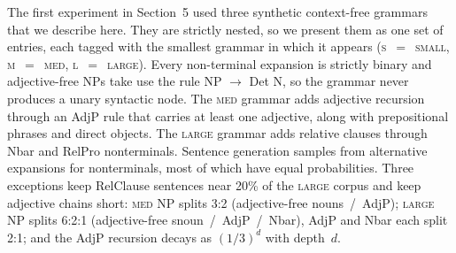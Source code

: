 \documentclass[11pt,letterpaper]{article}
\begin{document}
The first experiment in Section~5 used three synthetic context-free 
grammars that we describe here. They are strictly nested, so we 
present them as one set of entries, each tagged with the smallest 
grammar in which it appears (\textsc{s}~$=$~\textsc{small}, 
\textsc{m}~$=$~\textsc{med}, \textsc{l}~$=$~\textsc{large}). 
Every non-terminal expansion is strictly binary and adjective-free 
NPs take use the rule NP $\rightarrow$ Det N, so the grammar never 
produces a unary syntactic node. The \textsc{med} grammar adds adjective 
recursion through an AdjP rule that carries at least one adjective, 
along with prepositional phrases and direct objects. The 
\textsc{large} grammar adds relative clauses through  
Nbar and RelPro nonterminals. Sentence generation samples
from alternative expansions for nonterminals, most of which 
have equal probabilities. Three exceptions keep RelClause sentences 
near 20\% of the \textsc{large} corpus and keep adjective chains short: 
\textsc{med} NP splits 3:2 (adjective-free nouns~/~AdjP); \textsc{large} 
NP splits 6:2:1 (adjective-free snoun~/~AdjP~/~Nbar), AdjP and Nbar each 
split 2:1; and the AdjP recursion decays as $(1/3)^{d}$ with depth~$d$.
\end{document}
